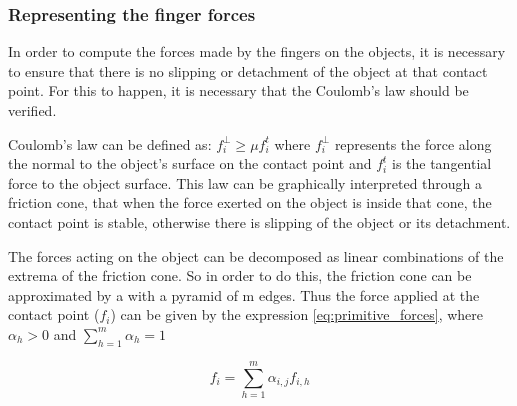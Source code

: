 \subsubsection{Representing the finger forces}

In order to compute the forces made by the fingers on the objects, it is necessary to ensure that there is no slipping or detachment of the object at that contact point.
For this to happen, it is necessary that the Coulomb's law should be verified.

Coulomb's law can be defined as: $f_i^{\bot} \ge \mu f_i^t$ where $f_i^{\bot}$ represents the force along the normal to the object's surface on the contact point and $ f_i^t$ is the tangential force to the object surface. 
This law can be graphically interpreted through a friction cone, that when the force exerted on the object is inside that cone, the contact point is stable, otherwise there is slipping of the object or its detachment.

The forces acting on the object can be decomposed as linear combinations of the extrema of the friction cone. So in order to do this, the friction cone can be approximated by a with a pyramid of m edges.
Thus the force applied at the contact point ($f_i$) can be given by the expression \eqref{eq:primitive_forces}, where $\alpha_h > 0$ and $\sum_{h=1}^{m}\alpha_h = 1   $

\begin{equation}\label{eq:primitive_forces}
    f_i= \sum_{h=1}^{m}\alpha_{i,j}f_{i,h}
\end{equation}
    

